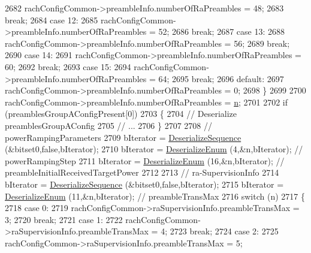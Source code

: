 \begin{DoxyCode}
2682       rachConfigCommon->preambleInfo.numberOfRaPreambles = 48;
2683       \textcolor{keywordflow}{break};
2684     \textcolor{keywordflow}{case} 12:
2685       rachConfigCommon->preambleInfo.numberOfRaPreambles = 52;
2686       \textcolor{keywordflow}{break};
2687     \textcolor{keywordflow}{case} 13:
2688       rachConfigCommon->preambleInfo.numberOfRaPreambles = 56;
2689       \textcolor{keywordflow}{break};
2690     \textcolor{keywordflow}{case} 14:
2691       rachConfigCommon->preambleInfo.numberOfRaPreambles = 60;
2692       \textcolor{keywordflow}{break};
2693     \textcolor{keywordflow}{case} 15:
2694       rachConfigCommon->preambleInfo.numberOfRaPreambles = 64;
2695       \textcolor{keywordflow}{break};
2696     \textcolor{keywordflow}{default}:
2697       rachConfigCommon->preambleInfo.numberOfRaPreambles = 0;
2698     \}
2699 
2700   rachConfigCommon->preambleInfo.numberOfRaPreambles = \hyperlink{namespacesample-rng-plot_aeb5ee5c431e338ef39b7ac5431242e1d}{n};
2701 
2702   \textcolor{keywordflow}{if} (preamblesGroupAConfigPresent[0])
2703     \{
2704       \textcolor{comment}{// Deserialize preamblesGroupAConfig}
2705       \textcolor{comment}{// ...}
2706     \}
2707 
2708   \textcolor{comment}{// powerRampingParameters}
2709   bIterator = \hyperlink{classns3_1_1Asn1Header_a58c68bb97ba3fe2e8fcdd7c208d672b2}{DeserializeSequence} (&bitset0,\textcolor{keyword}{false},bIterator);
2710   bIterator = \hyperlink{classns3_1_1Asn1Header_a4fcc253e0eec3483c775b005c1875f2d}{DeserializeEnum} (4,&n,bIterator); \textcolor{comment}{// powerRampingStep}
2711   bIterator = \hyperlink{classns3_1_1Asn1Header_a4fcc253e0eec3483c775b005c1875f2d}{DeserializeEnum} (16,&n,bIterator); \textcolor{comment}{// preambleInitialReceivedTargetPower}
2712 
2713   \textcolor{comment}{// ra-SupervisionInfo}
2714   bIterator = \hyperlink{classns3_1_1Asn1Header_a58c68bb97ba3fe2e8fcdd7c208d672b2}{DeserializeSequence} (&bitset0,\textcolor{keyword}{false},bIterator);
2715   bIterator = \hyperlink{classns3_1_1Asn1Header_a4fcc253e0eec3483c775b005c1875f2d}{DeserializeEnum} (11,&n,bIterator); \textcolor{comment}{// preambleTransMax}
2716   \textcolor{keywordflow}{switch} (n)
2717     \{
2718     \textcolor{keywordflow}{case} 0:
2719       rachConfigCommon->raSupervisionInfo.preambleTransMax = 3;
2720       \textcolor{keywordflow}{break};
2721     \textcolor{keywordflow}{case} 1:
2722       rachConfigCommon->raSupervisionInfo.preambleTransMax = 4;
2723       \textcolor{keywordflow}{break};
2724     \textcolor{keywordflow}{case} 2:
2725       rachConfigCommon->raSupervisionInfo.preambleTransMax = 5;

\end{DoxyCode}
